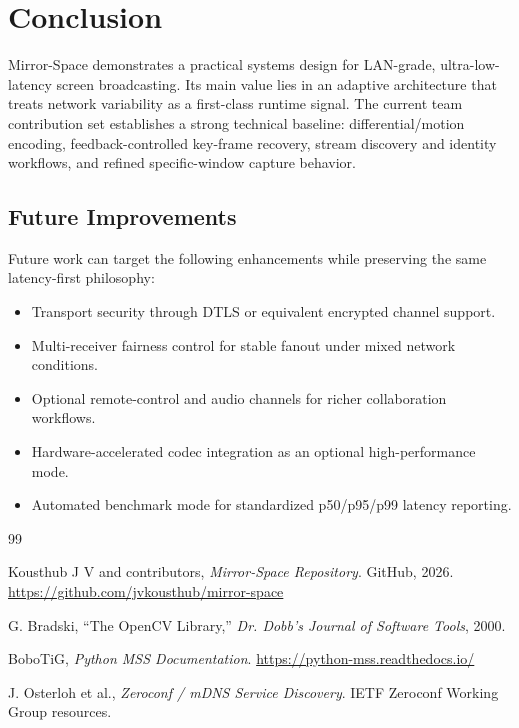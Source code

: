 \documentclass[12pt,a4paper]{article}
\begin{document}
\section{Conclusion}

Mirror-Space demonstrates a practical systems design for LAN-grade, ultra-low-latency screen broadcasting. Its main value lies in an adaptive architecture that treats network variability as a first-class runtime signal. The current team contribution set establishes a strong technical baseline: differential/motion encoding, feedback-controlled key-frame recovery, stream discovery and identity workflows, and refined specific-window capture behavior.

\subsection{Future Improvements}
Future work can target the following enhancements while preserving the same latency-first philosophy:
\begin{itemize}[leftmargin=*, itemsep=4pt]
  \item Transport security through DTLS or equivalent encrypted channel support.
  \item Multi-receiver fairness control for stable fanout under mixed network conditions.
  \item Optional remote-control and audio channels for richer collaboration workflows.
  \item Hardware-accelerated codec integration as an optional high-performance mode.
  \item Automated benchmark mode for standardized p50/p95/p99 latency reporting.
\end{itemize}

\newpage


\begin{thebibliography}{99}

Kousthub J V and contributors,
\textit{Mirror-Space Repository}.
GitHub, 2026.
\url{https://github.com/jvkousthub/mirror-space}

G. Bradski,
``The OpenCV Library,''
\textit{Dr. Dobb's Journal of Software Tools}, 2000.

BoboTiG,
\textit{Python MSS Documentation}.
\url{https://python-mss.readthedocs.io/}

J. Osterloh et al.,
\textit{Zeroconf / mDNS Service Discovery}.
IETF Zeroconf Working Group resources.

\end{thebibliography}
\end{document}
